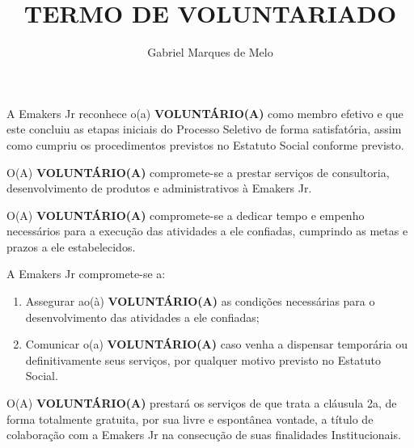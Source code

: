 





\def\titulo{TERMO DE VOLUNTARIADO}

\def\nome{NOME}
\def\profissao{PROFISSÃO}
\def\nacionalidade{NACIONALIDADE}
\def\estadoCivil{ESTADO CIVIL}
\def\rua{RUA}
\def\numero{NÚMERO}
\def\bairro{BAIRRO}
\def\cidadeUF{CIDADE/UF}
\def\cpf{111.111.111-11}
\def\rg{11.111.111}

\title{\titulo}
\author{Gabriel Marques de Melo}



    \maketitle
    \thispagestyle{first_page}
    \pagestyle{all_pages}
    \contratada
    \voluntario

    \clausula A Emakers Jr reconhece o(a) \textbf{VOLUNTÁRIO(A)} como membro efetivo e que
    este concluiu as etapas iniciais do Processo Seletivo de forma satisfatória, assim como cumpriu
    os procedimentos previstos no Estatuto Social conforme previsto.

    \clausula O(A) \textbf{VOLUNTÁRIO(A)} compromete-se a prestar serviços de consultoria,
    desenvolvimento de produtos e administrativos à Emakers Jr.

    \paragrafo O(A) \textbf{VOLUNTÁRIO(A)} compromete-se a dedicar tempo e empenho
    necessários para a execução das atividades a ele confiadas, cumprindo as metas e prazos a ele
    estabelecidos.

    \clausula A Emakers Jr compromete-se a:
    \begin{enumerate}
        \item Assegurar ao(à) \textbf{VOLUNTÁRIO(A)} as condições necessárias para o desenvolvimento
              das atividades a ele confiadas;
        \item Comunicar o(a) \textbf{VOLUNTÁRIO(A)} caso venha a dispensar temporária ou
              definitivamente seus serviços, por qualquer motivo previsto no Estatuto Social.
    \end{enumerate}

    
    \clausula O(A) \textbf{VOLUNTÁRIO(A)} prestará os serviços de que trata a cláusula 2a, de forma
    totalmente gratuita, por sua livre e espontânea vontade, a título de colaboração com a Emakers
    Jr na consecução de suas finalidades Institucionais.

